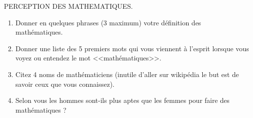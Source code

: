 \documentclass{article}
\begin{document}
PERCEPTION DES MATHEMATIQUES.
  \begin{enumerate}
  \item Donner en quelques phrases (3 maximum) votre définition des
    mathématiques.
  \item Donner une liste des 5 premiers mots qui vous viennent à l'esprit
    lorsque vous voyez ou entendez le mot <<mathématiques>>. 
  \item Citez 4 noms de mathématiciens (inutile d'aller sur wikipédia
    le but est de savoir ceux que vous connaissez). 
    \begin{Mathématicien}
      \item 
      \item 
      \item 
      \item 
    \end{Mathématicien}
  \item Selon vous les hommes sont-ils plus aptes que les femmes pour
    faire des mathématiques ? 


\end{enumerate}
\end{document}
